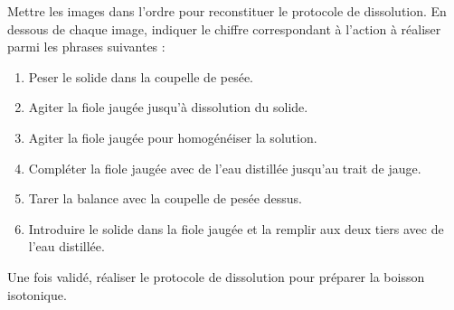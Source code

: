 

\numeroQuestion
Mettre les images dans l'ordre pour reconstituer le protocole de dissolution.
En dessous de chaque image, indiquer le chiffre correspondant à l'action à réaliser parmi les phrases suivantes :
\begin{enumerate}
  \item Peser le solide dans la coupelle de pesée.
  \item Agiter la fiole jaugée jusqu'à dissolution du solide.
  \item Agiter la fiole jaugée pour homogénéiser la solution.
  \item Compléter la fiole jaugée avec de l'eau distillée jusqu’au trait de jauge.
  \item Tarer la balance avec la coupelle de pesée dessus.
  \item Introduire le solide dans la fiole jaugée et la remplir aux deux tiers avec de l'eau distillée.
\end{enumerate}

\begin{boite}
  \vAligne{10cm}
\end{boite}

\numeroQuestion Une fois validé, réaliser le protocole de dissolution pour préparer la boisson isotonique.
